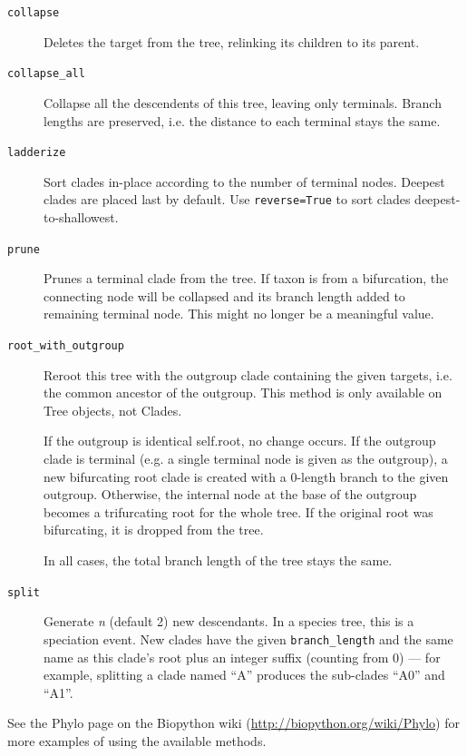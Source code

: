 \documentclass{report}
\begin{document}
\begin{description}
  \item[\texttt{collapse}]
    Deletes the target from the tree, relinking its children to its parent.

  \item[\texttt{collapse\_all}]
    Collapse all the descendents of this tree, leaving only terminals. Branch lengths are
    preserved, i.e. the distance to each terminal stays the same.

  \item[\texttt{ladderize}]
    Sort clades in-place according to the number of terminal nodes.  Deepest clades are placed
    last by default. Use \verb|reverse=True| to sort clades deepest-to-shallowest.

  \item[\texttt{prune}]
    Prunes a terminal clade from the tree.  If taxon is from a bifurcation, the connecting node
    will be collapsed and its branch length added to remaining terminal node. This might no
    longer be a meaningful value.

  \item[\texttt{root\_with\_outgroup}]
    Reroot this tree with the outgroup clade containing the given targets, i.e. the common
    ancestor of the outgroup. This method is only available on Tree objects, not Clades.

    If the outgroup is identical self.root, no change occurs. If the outgroup clade is terminal
    (e.g. a single terminal node is given as the outgroup), a new bifurcating root clade is
    created with a 0-length branch to the given outgroup. Otherwise, the internal node at the
    base of the outgroup becomes a trifurcating root for the whole tree. If the original root
    was bifurcating, it is dropped from the tree.

    In all cases, the total branch length of the tree stays the same.

  \item[\texttt{split}]
    Generate \textit{n} (default 2) new descendants. In a species tree, this is a speciation
    event.  New clades have the given \verb|branch_length| and the same name as this clade's
    root plus an integer suffix (counting from 0) --- for example, splitting a clade named
    ``A'' produces the sub-clades ``A0'' and ``A1''.

\end{description}

See the Phylo page on the Biopython wiki (\url{http://biopython.org/wiki/Phylo}) for
more examples of using the available methods.
\end{document}
